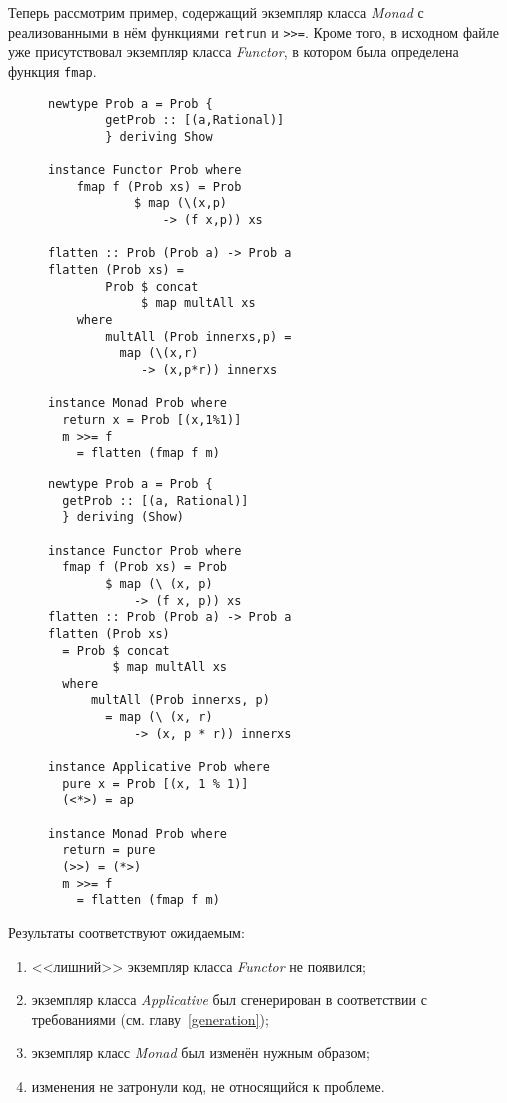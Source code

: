 Теперь рассмотрим пример, содержащий экземпляр класса \textit{Monad} с реализованными в нём функциями \lstinline{retrun} и \lstinline{>>=}. Кроме того, в исходном файле уже присутствовал экземпляр класса \textit{Functor}, в котором была определена функция \lstinline{fmap}.
\begin{figure}[!h]
\begin{parcolumns}{2}
\end{parcolumns}

\begin{minipage}{.45\textwidth}
\begin{lstlisting}
newtype Prob a = Prob { 
        getProb :: [(a,Rational)] 
        } deriving Show

instance Functor Prob where  
    fmap f (Prob xs) = Prob 
            $ map (\(x,p) 
                -> (f x,p)) xs

flatten :: Prob (Prob a) -> Prob a  
flatten (Prob xs) = 
        Prob $ concat 
             $ map multAll xs  
    where 
        multAll (Prob innerxs,p) = 
          map (\(x,r) 
             -> (x,p*r)) innerxs

instance Monad Prob where  
  return x = Prob [(x,1%1)]  
  m >>= f 
    = flatten (fmap f m)
\end{lstlisting}
\end{minipage}
\begin{minipage}{.45\textwidth}
\begin{lstlisting}
newtype Prob a = Prob {
  getProb :: [(a, Rational)]
  } deriving (Show)

instance Functor Prob where
  fmap f (Prob xs) = Prob 
        $ map (\ (x, p) 
            -> (f x, p)) xs
flatten :: Prob (Prob a) -> Prob a
flatten (Prob xs)
  = Prob $ concat 
         $ map multAll xs
  where
      multAll (Prob innerxs, p) 
        = map (\ (x, r) 
            -> (x, p * r)) innerxs

instance Applicative Prob where
  pure x = Prob [(x, 1 % 1)]
  (<*>) = ap

instance Monad Prob where
  return = pure
  (>>) = (*>)
  m >>= f 
    = flatten (fmap f m)
\end{lstlisting}
\end{minipage}
\end{figure}

Результаты соответствуют ожидаемым:
\begin{enumerate}[1)]
\item <<лишний>> экземпляр класса \textit{Functor} не появился;
\item экземпляр класса \textit{Applicative} был сгенерирован в соответствии с требованиями (см. главу~\ref{generation});
\item экземпляр класс \textit{Monad} был изменён нужным образом;
\item изменения не затронули код, не относящийся к проблеме.
\end{enumerate}

